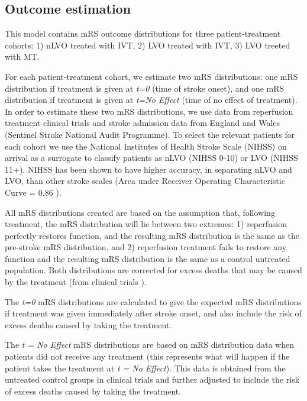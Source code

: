 \begin{multicols}{2}
\subsection{Outcome estimation}

This model contains mRS outcome distributions for three patient-treatment cohorts: 1) nLVO treated with IVT, 2) LVO treated with IVT, 3) LVO treeted with MT.

For each patient-treatment cohort, we estimate two mRS distributions: one mRS distribution if treatment is given at \emph{t=0} (time of stroke onset), and one mRS distribution if treatment is given at \emph{t=No Effect} (time of no effect of treatment). In order to estimate these two mRS distributions, we use data from reperfusion treatment clinical trials \cite{lees_time_2010, emberson_effect_2014, goyal_endovascular_2016} and stroke admission data from England and Wales (Sentinel Stroke National Audit Programme). To select the relevant patients for each cohort we use the National Institutes of Health Stroke Scale (NIHSS) on arrival as a surrogate to classify patients as nLVO (NIHSS 0-10) or LVO (NIHSS 11+). NIHSS has been shown to have higher accuracy, in separating nLVO and LVO, than other stroke scales (Area under Receiver Operating Characteristic Curve = 0.86 \cite{duvekot_comparison_2021}).

All mRS distributions created are based on the assumption that, following treatment, the mRS distribution will lie between two extremes: 1) reperfusion perfectly restores function, and the resulting mRS distribution is the same as the pre-stroke mRS distribution, and 2) reperfusion treatment fails to restore any function and the resulting mRS distribution is the same as a control untreated population. Both distributions are corrected for excess deaths that may be caused by the treatment (from clinical trials \cite{emberson_effect_2014, goyal_endovascular_2016}). 

The \textit{t=0} mRS distributions are calculated to give the expected mRS distributions if treatment was given immediately after stroke onset, and also include the risk of excess deaths caused by taking the treatment. 

The \textit{t = No Effect} mRS distributions are based on mRS distribution data when patients did not receive any treatment (this represents what will happen if the patient takes the treatment at \textit{t = No Effect}). This data is obtained from the untreated control groups in clinical trials and further adjusted to include the risk of excess deaths caused by taking the treatment.


\end{multicols}
